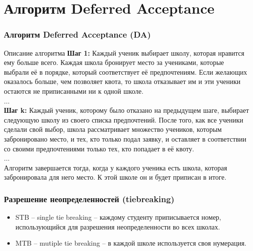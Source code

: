 \documentclass[10pt,pdf,hyperref={unicode}]{beamer}
\begin{document}
\section{Алгоритм Deferred Acceptance}

\begin{frame}
    \frametitle{Алгоритм Deferred Acceptance (DA)}
    \begin{block}{Описание алгоритма}
        {\bf Шаг 1:} Каждый ученик выбирает школу, которая нравится ему больше всего. Каждая школа бронирует место за учениками, которые выбрали её в порядке, который соответствует её предпочтениям. Если желающих оказалось больше, чем позволяет квота, то школа отказывает им и эти ученики остаются не приписанными ни к одной школе.\\
        $\dots$\\
        {\bf Шаг k:} Каждый ученик, которому было отказано на предыдущем шаге, выбирает следующую школу из своего списка предпочтений. После того, как все ученики сделали свой выбор, школа рассматривает множество учеников, которым забронировано место, и тех, кто только подал заявку, и оставляет в соответствии со своими предпочтениями только тех, кто попадает в её квоту.\\
        $\dots$\\
        Алгоритм завершается тогда, когда у каждого ученика есть школа, которая забронировала для него место. К этой школе он и будет приписан в итоге.
    \end{block}
\end{frame}

\begin{frame}
    \frametitle{Разрешение неопределенностей (tiebreaking)}
    \begin{block}{ }
        \begin{itemize}
        \item STB -- single tie breaking -- каждому студенту приписывается номер, использующийся для разрешения неопределенности во всех школах.
        \item MTB -- mutiple tie breaking -- в каждой школе используется своя нумерация.
        \end{itemize}
    \end{block}

    \begin{figure}[H]
        \noindent{}
    \end{figure}
\end{frame}
\end{document}
